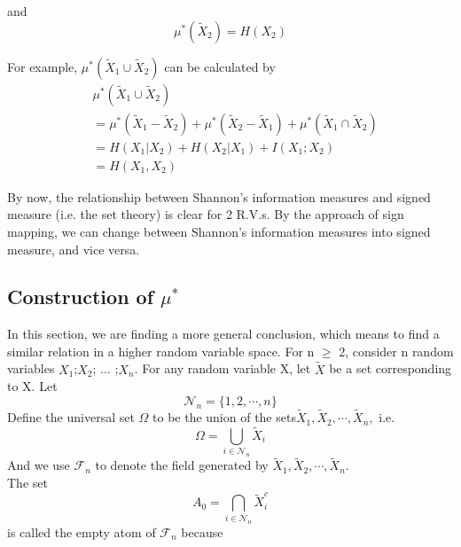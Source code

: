 and
\begin{equation}
\mu^{*}\left(\tilde{X}_{2}\right)=H\left(X_{2}\right)
\end{equation}



For example, $\mu^{*}\left(\tilde{X}_{1} \cup \tilde{X}_{2}\right)$ can be calculated by
\begin{align}
&\mu^{*}\left(\tilde{X}_{1} \cup \tilde{X}_{2}\right)\\
&=\mu^{*}\left(\tilde{X}_{1}-\tilde{X}_{2}\right)+\mu^{*}\left(\tilde{X}_{2}-\tilde{X}_{1}\right)+\mu^{*}\left(\tilde{X}_{1} \cap \tilde{X}_{2}\right)\\
&=H\left(X_{1} | X_{2}\right)+H\left(X_{2} | X_{1}\right)+I\left(X_{1} ; X_{2}\right) \\
&=H\left(X_{1}, X_{2}\right) 
\end{align}


By now, the relationship between Shannon's information measures and signed measure (i.e. the set theory) is clear for 2 R.V.s. By the approach of sign mapping, we can change between Shannon's information measures into signed measure, and vice versa. 



 \subsection{\protect\boldmath Construction of  \texorpdfstring{$\mu^{*}$}{\textmu*}}
 
 In this section, we are finding a more general conclusion, which means to find a similar relation in a higher random variable space. For n $\geq$ 2, consider n random variables ${X}_{1}$;${X}_{2}$; ... ;${X}_{n}$. For any random variable X,
let $\tilde{X}$ be a set corresponding to X. Let
\begin{equation}
    \mathcal{N}_{n}=\{1,2, \cdots, n\}
\end{equation}
Define the universal set $\Omega$ to be the union of the sets$\tilde{X}_{1}, \tilde{X}_{2}, \cdots, \tilde{X}_{n},$ i.e.
\begin{equation}
    \Omega=\bigcup_{i \in \mathcal{N}_{n}} \tilde{X}_{i}
\end{equation}
And we use $\mathcal{F}_{n}$ to denote the field generated by $\tilde{X}_{1}, \tilde{X}_{2}, \cdots, \tilde{X}_{n} .$\\

The set
\[
A_{0}=\bigcap_{i \in \mathcal{N}_{n}} \tilde{X}_{i}^{c}
\]   
is called the empty atom of $\mathcal{F}_{n}$ because

